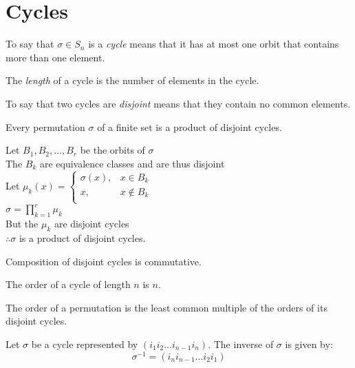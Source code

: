 \documentclass[letterpaper,12pt,fleqn]{article}
\renewcommand{\o}{\sigma}
\begin{document}
\section*{Cycles}

\begin{definition}
  To say that $\o\in S_n$ is a \emph{cycle} means that it has at most one
  orbit that contains more than one element.

  The \emph{length} of a cycle is the number of elements in the cycle.

  To say that two cycles are \emph{disjoint} means that they contain no common
  elements.
\end{definition}

\begin{theorem}
  Every permutation $\o$ of a finite set is a product of disjoint cycles.
\end{theorem}

\begin{theproof}
  Let $B_1,B_2,\ldots,B_r$ be the orbits of $\o$ \\
  The $B_k$ are equivalence classes and are thus disjoint \\
  Let $\mu_k(x)=\begin{cases}
  \o(x), & x\in B_k \\
  x, & x\notin B_k \\
  \end{cases}$ \\
  $\o=\prod_{k=1}^r\mu_k$ \\
  But the $\mu_k$ are disjoint cycles \\
  $\therefore \o$ is a product of disjoint cycles.
\end{theproof}

\begin{corollary}
  Composition of disjoint cycles is commutative.
\end{corollary}

\begin{theorem}
  The order of a cycle of length $n$ is $n$.
\end{theorem}

\begin{corollary}
  The order of a permutation is the least common multiple of the orders of its
  disjoint cycles.
\end{corollary}

\begin{theorem}
  Let $\o$ be a cycle represented by $(i_1 i_2 \ldots i_{n-1} i_n)$. The inverse
  of $\o$ is given by:
  \[\o^{-1}=(i_n i_{n-1} \ldots i_2 i_1)\]
\end{theorem}
\end{document}
